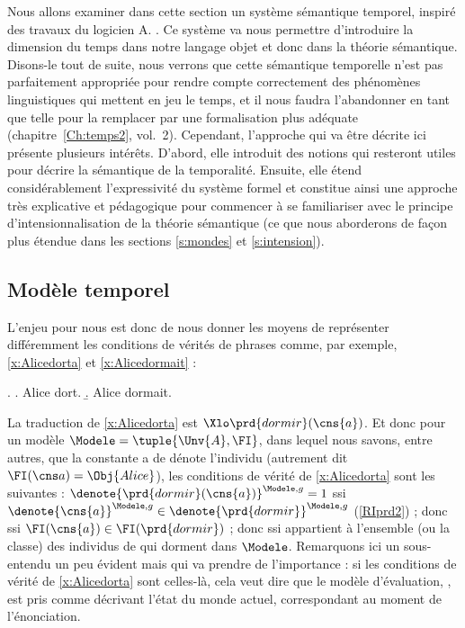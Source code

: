 Nous allons examiner dans cette section un système sémantique
temporel, inspiré des travaux du logicien
A. \citet{Prior:67}.
Ce système
va nous permettre d'introduire la dimension du temps dans notre
langage objet {\LO} et donc dans la théorie sémantique.  Disons-le
tout de suite, nous verrons que cette sémantique temporelle n'est pas
parfaitement appropriée  pour rendre compte correctement des
phénomènes linguistiques qui mettent en jeu le temps, et il nous
faudra l'abandonner en tant que telle pour la remplacer par une
formalisation plus adéquate (chapitre~\ref{Ch:temps2}, vol.~2).  Cependant,
l'approche qui va être décrite ici présente plusieurs intérêts.
D'abord, elle introduit des notions qui resteront utiles pour décrire
la sémantique de la temporalité.  Ensuite, elle étend considérablement
l'expressivité du système formel et constitue ainsi une approche
très explicative et pédagogique pour commencer à se familiariser avec
le principe d'intensionnalisation de la théorie sémantique (ce que
nous aborderons de façon plus étendue dans les sections \ref{s:mondes} et
\ref{s:intension}). 



\subsection{Modèle temporel}
\label{s:ModeleTemp}

L'enjeu pour nous est donc de nous donner les moyens de représenter
différemment les conditions de vérités de phrases comme, par exemple, 
\ref{x:Alicedorta} et \ref{x:Alicedormait} :

\ex. 
\a. Alice dort. \label{x:Alicedorta}
\b. Alice dormait.\label{x:Alicedormait} 


La traduction de \ref{x:Alicedorta} est
\(\Xlo\prd{dormir}(\cns{a})\). 
Et donc pour un
modèle \(\Modele = \tuple{\Unv{A},\FI}\), dans lequel nous savons,
entre autres, que la constante \cns a de {\LO} dénote l'individu
 (autrement dit $\FI(\cns a)=\Obj{Alice}$), 
les conditions de vérité de \ref{x:Alicedorta} 
sont les suivantes :
\(%
\denote{\prd{dormir}(\cns{a})}^{\Modele,g} =1\) ssi
\(\denote{\cns{a}}^{\Modele,g} \in \denote{\prd{dormir}}^{\Modele,g}\) (\RSem\ref{RIprd2}) ; donc
ssi \(\FI(\cns{a}) \in \FI(\prd{dormir})\) ; donc ssi 
appartient à l'ensemble (ou la classe) des individus de {} qui
dorment dans $\Modele$. 
Remarquons ici un sous-entendu un peu évident mais qui va prendre de
l'importance : si les conditions de vérité de \ref{x:Alicedorta} sont
celles-là, cela veut dire que le modèle d'évaluation, \Modele, est
pris comme décrivant l'état du monde actuel,  correspondant au moment
de l'énonciation.

